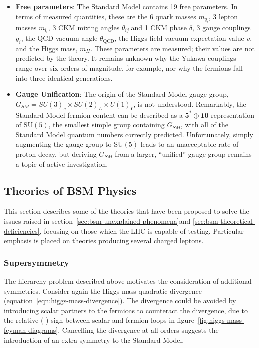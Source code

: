 \begin{itemize}
	\item \textbf{Free parameters}: The Standard Model contains 19 free parameters. In terms of measured quantities, these are the 6 quark masses $m_{q_i}$, 3 lepton masses $m_{l_i}$, 3 CKM mixing angles $\theta_{ij}$ and 1 CKM phase $\delta$, 3 gauge couplings $g_i$, the QCD vacuum angle $\theta_{\mathrm{QCD}}$, the Higgs field vacuum expectation value $v$, and the Higgs mass, $m_H$. These parameters are measured; their values are not predicted by the theory. It remains unknown why the Yukawa couplings range over six orders of magnitude, for example, nor why the fermions fall into three identical generations. 


	\item \textbf{Gauge Unification}: The origin of the Standard Model gauge group, $G_{SM}=SU(3)_c\times SU(2)_L \times U(1)_Y$, is not understood. Remarkably, the Standard Model fermion content can be described as a $\mathbf{5}^{*}\oplus \mathbf{10}$ representation of $\mathrm{SU}(5)$, the smallest simple group containing $G_{SM}$, with all of the Standard Model quantum numbers correctly predicted. Unfortunately, simply augmenting the gauge group to $\mathrm{SU}(5)$ leads to an unacceptable rate of proton decay, but deriving $G_{SM}$ from a larger, ``unified'' gauge group remains a topic of active investigation.  
\end{itemize}

\subsection{Theories of BSM Physics}\label{sec:bsm-theories}
This section describes some of the theories that have been proposed to solve the issues raised in section~\ref{sec:bsm-unexplained-phenomena}and \ref{sec:bsm-theoretical-deficiencies}, focusing on those which the LHC is capable of testing. Particular emphasis is placed on theories producing several charged leptons. 

\subsubsection{Supersymmetry}
The hierarchy problem described above motivates the consideration of additional symmetries. Consider again the Higgs mass quadratic divergence (equation~\ref{eqn:higgs-mass-divergence}). The divergence could be avoided by introducing scalar partners to the fermions to counteract the divergence, due to the relative (-) sign between scalar and fermion loops in figure~\ref{fig:higgs-mass-feyman-diagrams}. Cancelling the divergence at all orders suggests the introduction of an extra symmetry to the Standard Model. 

